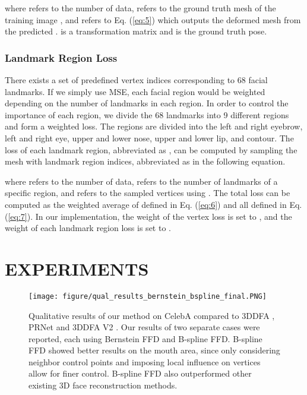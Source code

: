 \documentclass[letterpaper, 10 pt, conference]{ieeeconf}
\begin{document}
where  refers to the number of data,  refers to the ground truth mesh of the training image , and  refers to Eq. (\ref{eq:5}) which outputs the deformed mesh from the predicted .  is a  transformation matrix and  is the ground truth pose. 


\subsubsection{Landmark Region Loss}

There exists a set of predefined vertex indices corresponding to 68 facial landmarks. If we simply use MSE, each facial region would be weighted depending on the number of landmarks in each region. In order to control the importance of each region, we divide the 68 landmarks into 9 different regions and form a weighted loss. The regions are divided into the left and right eyebrow, left and right eye, upper and lower nose, upper and lower lip, and contour. The loss of each landmark region, abbreviated as , can be computed by sampling the mesh with landmark region indices, abbreviated as  in the following equation.

\small

\normalsize
where  refers to the number of data,  refers to the number of landmarks of a specific region, and  refers to the sampled vertices using . The total loss can be computed as the weighted average of  defined in Eq. (\ref{eq:6}) and all  defined in Eq. (\ref{eq:7}). In our implementation, the weight of the vertex loss is set to , and the weight of each landmark region loss is set to .


\section{EXPERIMENTS}

\begin{figure*}[t]
\centering
\texttt{[image: figure/qual\_results\_bernstein\_bspline\_final.PNG]}
\caption{Qualitative results of our method on CelebA compared to 3DDFA \cite{zhu2016face}, PRNet \cite{feng2018joint} and 3DDFA V2 \cite{guo2020towards}. Our results of two separate cases were reported, each using Bernstein FFD and B-spline FFD. B-spline FFD showed better results on the mouth area, since only considering neighbor control points and imposing local influence on vertices allow for finer control. B-spline FFD also outperformed other existing 3D face reconstruction methods.}\label{fig:3}
\end{figure*}
\end{document}
